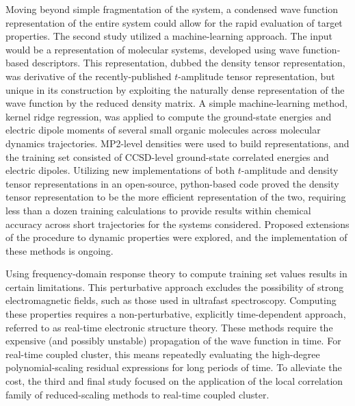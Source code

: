 Moving beyond simple fragmentation of the system, a condensed wave function
representation of the entire system could allow for the rapid evaluation of
target properties. The second study utilized a machine-learning approach. The
input would be a representation of molecular systems, developed using wave
function-based descriptors. This representation, dubbed the density tensor
representation, was derivative of the recently-published $t$-amplitude tensor
representation, but unique in its construction by exploiting the naturally
dense representation of the wave function by the reduced density matrix. A
simple machine-learning method, kernel ridge regression, was applied to
compute the ground-state energies and electric dipole moments of several
small organic molecules across molecular dynamics trajectories. MP2-level
densities were used to build representations, and the training set
consisted of CCSD-level ground-state correlated energies and electric
dipoles. Utilizing new implementations of both $t$-amplitude and density
tensor representations in an open-source, python-based code proved the
density tensor representation to be the more efficient representation
of the two, requiring less than a dozen training calculations to provide
results within chemical accuracy across short trajectories for the systems
considered. Proposed extensions of the procedure to dynamic properties
were explored, and the implementation of these methods is ongoing.

Using frequency-domain response theory to compute training set values
results in certain limitations. This perturbative approach excludes the
possibility of strong electromagnetic fields, such as those used in ultrafast
spectroscopy. Computing these properties requires a non-perturbative,
explicitly time-dependent approach, referred to as real-time electronic
structure theory. These methods require the expensive (and possibly unstable)
propagation of the wave function in time. For real-time coupled cluster,
this means repeatedly evaluating the high-degree polynomial-scaling residual
expressions for long periods of time. To alleviate the cost, the third and
final study focused on the application of the local correlation family of
reduced-scaling methods to real-time coupled cluster.

